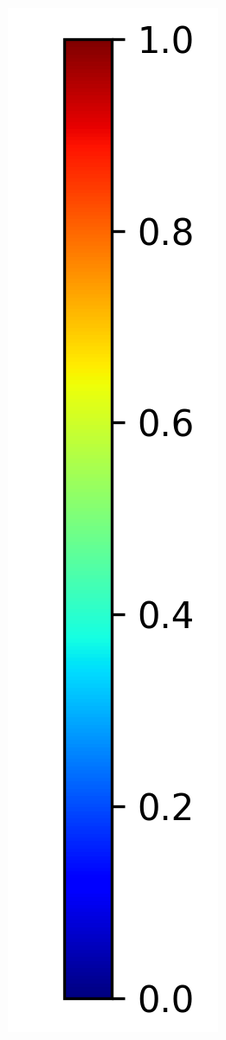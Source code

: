 \documentclass{article}
\begin{document}
\begin{figure}[ht]
\begin{subfigure}{0.14\linewidth}
        \centering
        \vspace{-1cm}
        \includegraphics[width=\linewidth]{colorbar_jet.png}

\end{subfigure}
\end{figure}
\end{document}
